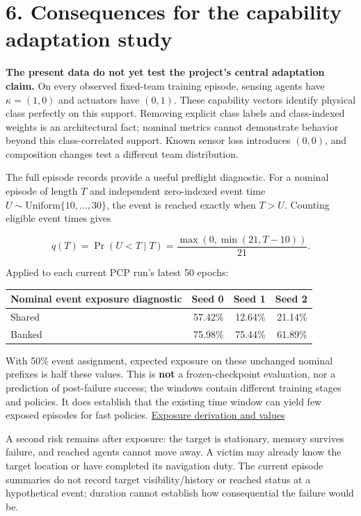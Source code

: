 \documentclass[
  10pt,
]{article}
\begin{document}
\section{6. Consequences for the capability adaptation
study}\label{consequences-for-the-capability-adaptation-study}

\textbf{The present data do not yet test the project's central
adaptation claim.} On every observed fixed-team training episode,
sensing agents have \(\kappa=(1,0)\) and actuators have \((0,1)\). These
capability vectors identify physical class perfectly on this support.
Removing explicit class labels and class-indexed weights is an
architectural fact; nominal metrics cannot demonstrate behavior beyond
this class-correlated support. Known sensor loss introduces \((0,0)\),
and composition changes test a different team distribution.

The full episode records provide a useful preflight diagnostic. For a
nominal episode of length \(T\) and independent zero-indexed event time
\(U\sim\mathrm{Uniform}\{10,\ldots,30\}\), the event is reached exactly
when \(T>U\). Counting eligible event times gives

\[
q(T)=\Pr(U<T\mid T)
=\frac{\max(0,\min(21,T-10))}{21}.
\]

Applied to each current PCP run's latest 50 epochs:

\begin{longtable}[]{@{}lrrr@{}}
\toprule\noalign{}
Nominal event exposure diagnostic & Seed 0 & Seed 1 & Seed 2 \\
\midrule\noalign{}
\endhead
\bottomrule\noalign{}
\endlastfoot
Shared & 57.42\% & 12.64\% & 21.14\% \\
Banked & 75.98\% & 75.44\% & 61.89\% \\
\end{longtable}

With 50\% event assignment, expected exposure on these unchanged nominal
prefixes is half these values. This is \textbf{not} a frozen-checkpoint
evaluation, nor a prediction of post-failure success; the windows
contain different training stages and policies. It does establish that
the existing time window can yield few exposed episodes for fast
policies.
\href{full_runs/softrole_audit/nominal_failure_exposure.json}{Exposure
derivation and values}

A second risk remains after exposure: the target is stationary, memory
survives failure, and reached agents cannot move away. A victim may
already know the target location or have completed its navigation duty.
The current episode summaries do not record target visibility/history or
reached status at a hypothetical event; duration cannot establish how
consequential the failure would be.
\end{document}
